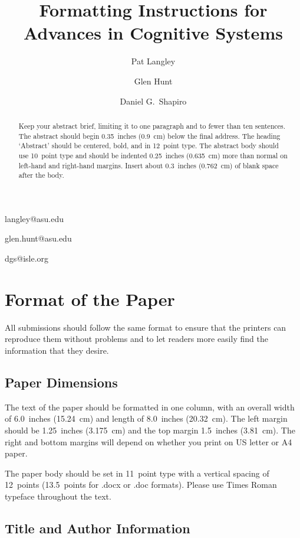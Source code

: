 \documentclass[11pt,letterpaper]{article}
\begin{document}
 

\title{Formatting Instructions for Advances in Cognitive Systems}
 
\author{Pat Langley}{langley@asu.edu}
\author{Glen Hunt}{glen.hunt@asu.edu}
\address{Computing Science and Engineering, Arizona State University, 
         Tempe, AZ 85287 USA}
\author{Daniel G.\ Shapiro}{dgs@isle.org}
\address{Institute for the Study of Learning and Expertise, 
         2164 Staunton Court, Palo Alto, CA 94306 USA}
\vskip 0.2in
 
\begin{abstract}Keep your abstract brief, limiting it to one paragraph 
and to fewer than ten sentences. The abstract should begin 0.35~inches 
(0.9~cm) below the final address. The heading `Abstract' should be
centered, bold, and in 12~point type. The abstract body should use
10~point type and should be indented 0.25~inches (0.635~cm) more than
normal on left-hand and right-hand margins. Insert about 0.3~inches 
(0.762~cm) of blank space after the body.
\end{abstract}

\section{Format of the Paper} 
 
All submissions should follow the same format to ensure that the 
printers can reproduce them without problems and to let readers 
more easily find the information that they desire.

\subsection{Paper Dimensions}

The text of the paper should be formatted in one column, with an
overall width of 6.0~inches (15.24~cm) and length of 8.0~inches 
(20.32~cm). The left margin should be 1.25~inches (3.175~cm) and the 
top margin 1.5~inches (3.81~cm). The right and bottom margins will
depend on whether you print on US letter or A4 paper.

The paper body should be set in 11~point type with a vertical spacing 
of 12~points (13.5~points for .docx or .doc formats). 
Please use Times Roman typeface throughout the text. 

\subsection{Title and Author Information}
\end{document}
